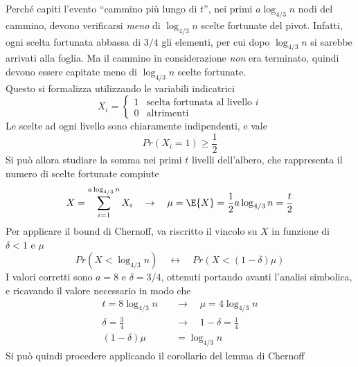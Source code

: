 Perché capiti l'evento ``cammino più lungo di $t$'', nei primi $
a
\log_{4/3} n
$ nodi del cammino, devono verificarsi \emph{meno} di $
\log_{4/3} n
$ scelte fortunate del pivot.
Infatti, ogni scelta fortunata abbassa di $3/4$ gli elementi, per cui dopo $
\log_{4/3} n
$ si sarebbe arrivati alla foglia. Ma il cammino in considerazione \emph{non} era terminato, quindi devono essere capitate meno di $
\log_{4/3} n
$ scelte fortunate.
\\
Questo si formalizza utilizzando le variabili indicatrici
\begin{equation*}
    X_i = 
    \begin{cases}
        1 & \text{scelta fortunata al livello $i$}
        \\
        0 & \text{altrimenti}
    \end{cases}
\end{equation*}
Le scelte ad ogni livello sono chiaramente indipendenti,
e vale 
\begin{equation*}
    Pr \left( X_i = 1 \right) \geq \frac{1}{2}
\end{equation*}
Si può allora studiare la somma nei primi $t$ livelli dell'albero, che rappresenta il numero di scelte fortunate compiute
\begin{equation*}
    X = \sum_{i=1}^{a \log_{4/3} n} X_i
    \quad
    \rightarrow
    \quad
    \mu = \E{X} = \frac{1}{2} a \log_{4/3} n = \frac{t}{2}
\end{equation*}
Per applicare il bound di Chernoff, va riscritto il vincolo su $X$ in funzione di $\delta < 1$ e $\mu$
\begin{equation*}
    Pr \left( 
        X < \log_{4/3} n
    \right)
    \quad
    \leftrightarrow
    \quad
    Pr \left( 
        X < \left( 1 - \delta \right) \mu
    \right)
\end{equation*}
I valori corretti sono $a=8$ e $\delta=3/4$, ottenuti portando avanti l'analisi simbolica, e ricavando il valore necessario in modo che
\begin{align*}
    t = 8 \log_{4/3} n
    \quad
    &
    \rightarrow
    \quad
    \mu = 4 \log_{4/3} n 
    \\
    \delta = \frac{3}{4}
    \quad
    &
    \rightarrow
    \quad
    1 - \delta = \frac{1}{4}
    \\
    \left( 1 - \delta \right) \mu &= \log_{4/3} n
\end{align*}
Si può quindi procedere applicando il corollario del lemma di Chernoff
